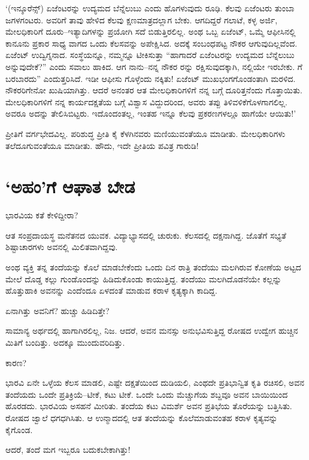 ‘(ಇನ್ಶೂರೆನ್ಸ್​) ಏಜೆಂಟರನ್ನು ಉದ್ಯಮದ ಬೆನ್ನೆಲುಬು ಎಂದು ಹೊಗಳುವುದು ರೂಢಿ. ಕೆಲವು ಏಜೆಂಟರು ತುಂಬಾ ಜಗಳಗಂಟರು. ಅವರಿಗೆ ತಾವು ಹೇಳಿದ ಕೆಲವು ಕ್ಷಣಮಾತ್ರದಲ್ಲಾಗ ಬೇಕು. ಆಗದಿದ್ದರೆ ಗಲಾಟೆ, ಕಳ್ಳ ಅರ್ಜಿ, ಮೇಲಧಿಕಾರಿಗೆ ದೂರು–ಇತ್ಯಾದಿಗಳನ್ನು ಪ್ರಯೋಗಿ ಸದೆ ಬಿಡುತ್ತಿರಲಿಲ್ಲ. ಅಂಥ ಒಬ್ಬ ಏಜೆಂಟ್, ಒಮ್ಮೆ ಆಫೀಸಿನಲ್ಲಿ ಕಾನೂನು ಪ್ರಕಾರ ಸಾಧ್ಯ ವಾಗದ ಒಂದು ಕೆಲಸವನ್ನು ಅಪೇಕ್ಷಿಸಿದ. ಅದಕ್ಕೆ ಸಂಬಂಧಪಟ್ಟ ನೌಕರ ಆಗುವುದಿಲ್ಲವೆಂದ. ಏಜೆಂಟ್ ಉದ್ವಿಗ್ನನಾದ. ಸಂಸ್ಥೆಯನ್ನೂ, ನಮ್ಮನ್ನೂ ಟೀಕಿಸುತ್ತಾ “ಹಾಗಾದರೆ ಏಜೆಂಟರನ್ನು ಉದ್ಯಮದ ಬೆನ್ನೆಲುಬು ಅನ್ನುವುದೇಕೆ?” ಎಂದು ಸವಾಲು ಹಾಕಿದ. ಆಗ ನಾನು–ನನ್ನ ನೌಕರ ರನ್ನು ರಕ್ಷಿಸುವುದಕ್ಕಾಗಿ, ನಲ್ಲಿಯೇ ಇರಬೇಕು. ಗೆ ಬರಬಾರದು” ಎಂದುತ್ತರಿಸಿದೆ. ಇಡೀ ಆಫೀಸು ಗೊಳ್ಳೆಂದು ನಕ್ಕಿತು! ಏಜೆಂಟ್ ಮುಖಭಂಗಗೊಂಡಂತಾಗಿ ಮರಳಿದ. ನೌಕರರಿಗೇನೋ ಖುಷಿಯಾಗಿತ್ತು. ಆದರೆ ಅನಂತರ ಆತ ಮೇಲಧಿಕಾರಿಗಳಿಗೆ ನನ್ನ ಬಗ್ಗೆ ದೂರಿತ್ತನೆಂದು ಗೊತ್ತಾಯಿತು. ಮೇಲಧಿಕಾರಿಗಳಿಗೆ ನನ್ನ ಕಾರ್ಯದಕ್ಷತೆಯ ಬಗ್ಗೆ ವಿಶ್ವಾಸ ವಿದ್ದುದರಿಂದ, ಅವರು ತಪ್ಪು ತಿಳಿವಳಿಕೆಗೊಳಗಾಗಲಿಲ್ಲ. ಅವರೂ ಅದನ್ನು ತೇಲಿಸಿಬಿಟ್ಟರು. ಇದೊಂದಂತಲ್ಲ, ಇಂತಹ ಇನ್ನೂ ಕೆಲವು ಪ್ರಕರಣಗಳಲ್ಲೂ ಹಾಗೆಯೇ ಆಯಿತು!’

ಪ್ರೀತಿಗೆ ವರ್ಗಭೇದವಿಲ್ಲ. ಪರಿಶುದ್ಧ ಪ್ರೀತಿ ಕೈ ಕೆಳಗಿನವರು ಮಣಿಯುವಂತೆಯೂ ಮಾಡೀತು. ಮೇಲಧಿಕಾರಿಗಳು ತಲೆದೂಗುವಂತೆಯೂ ಮಾಡೀತು. ಹೌದು, ಇದೇ ಪ್ರೀತಿಯ ಪವಿತ್ರ ಗಾರುಡಿ!


\section{‘ಅಹಂ’ಗೆ ಆಘಾತ ಬೇಡ}

ಭಾರವಿಯ ಕತೆ ಕೇಳಿದ್ದೀರಾ?

ಆತ ಸಂಪ್ರದಾಯಸ್ಥ ಮನೆತನದ ಯುವಕ. ವಿದ್ಯಾಭ್ಯಾಸದಲ್ಲಿ ಚುರುಕು. ಕೆಲಸದಲ್ಲಿ ದಕ್ಷನಾಗಿದ್ದ. ಜೊತೆಗೆ ಸಭ್ಯತೆ ಶಿಷ್ಟಾಚಾರಗಳು ಅವನಲ್ಲಿ ಮಿಲಿತವಾಗಿದ್ದವು.

ಅಂಥ ವ್ಯಕ್ತಿ ತನ್ನ ತಂದೆಯನ್ನು ಕೊಲೆ ಮಾಡಬೇಕೆಂದು ಒಂದು ದಿನ ರಾತ್ರಿ ತಂದೆಯು ಮಲಗಿರುವ ಕೋಣೆಯ ಅಟ್ಟದ ಮೇಲೆ ದೊಡ್ಡ ಕಲ್ಲು ಗುಂಡೊಂದನ್ನು ಹಿಡಿದುಕೊಂಡು ಕಾಯುತ್ತಿದ್ದ. ತಂದೆಯು ಮಲಗಿದೊಡನೆಯೇ ಕಲ್ಲನ್ನು ಹೊತ್ತುಹಾಕಿ ಅವನನ್ನು ಎಂದೆಂದೂ ಏಳದಂತೆ ಮಾಡುವ ಕರಾಳ ಕೃತ್ಯಕ್ಕಾಗಿ ಕಾದಿದ್ದ.

ಏನಾಗಿತ್ತು ಅವನಿಗೆ? ಹುಚ್ಚು ಹಿಡಿದಿತ್ತೇ?

ಸಾಮಾನ್ಯ ಅರ್ಥದಲ್ಲಿ ಹಾಗಾಗಿರಲಿಲ್ಲ, ನಿಜ. ಆದರೆ, ಅವನ ಮನಸ್ಸು ಅನುಭವಿಸುತ್ತಿದ್ದ ರೋಷದ ಉದ್ವೇಗ ಹುಚ್ಚಿನ ಮಿತಿಗೆ ಬಂದಿತ್ತು. ಅದಕ್ಕೂ ಮುಂದುವರಿದಿತ್ತು.

ಕಾರಣ?

ಭಾರವಿ ಏನೇ ಒಳ್ಳೆಯ ಕೆಲಸ ಮಾಡಲಿ, ಎಷ್ಟೇ ದಕ್ಷತೆಯಿಂದ ದುಡಿಯಲಿ, ಎಂಥದೇ ಪ್ರತಿಭಾನ್ವಿತ ಕೃತಿ ರಚಿಸಲಿ, ಅವನ ತಂದೆಯದು ಒಂದೇ ಪ್ರತಿಕ್ರಿಯೆ–ಟೀಕೆ, ಕಟು ಟೀಕೆ. ಒಂದೇ ಒಂದು ಮೆಚ್ಚುಗೆಯ ಶಬ್ದವೂ ಅವನ ಬಾಯಿಯಿಂದ ಹೊರಡದು. ಭಾರವಿಯ ಅಸಹನೆ ಮೀರಿತು. ತಂದೆಯ ಕಟು ವಿಮರ್ಶೆ ಅವನ ಪ್ರತಿಭೆಯ ತೊರೆಯನ್ನು ಬತ್ತಿಸಿತು. ರೋಷದ ಜ್ವಾಲೆ ಧಗಧಗಿಸಿತು. ಆ ಉನ್ಮಾದದಲ್ಲಿ ಆತ ತಂದೆಯನ್ನು ಕೊಲೆಮಾಡುವಂತಹ ಕರಾಳ ಕೃತ್ಯವನ್ನು ಕೈಗೊಂಡ.

ಆದರೆ, ತಂದೆ ಮಗ ಇಬ್ಬರೂ ಬದುಕಬೇಕಾಗಿತ್ತು!

